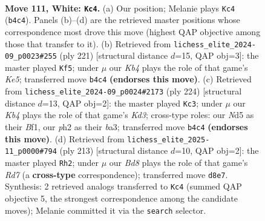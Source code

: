 \documentclass[11pt]{article}
\begin{document}
\clearpage

\begin{figure}[p]\centering
\begin{subfigure}{0.46\textwidth}\centering
\resizebox{\linewidth}{!}{%
\newchessgame
\chessboard[
  setfen={3B4/1k6/8/3N2R1/1K6/8/7p/8 w - - 0 111},
  showmover=false,
  pgfstyle=straightmove, color=movearrow, markmove={b4-c4}
]}
\caption{}
\end{subfigure}\hfill
\begin{subfigure}{0.46\textwidth}\centering
\resizebox{\linewidth}{!}{%
\newchessgame
\chessboard[
  setfen={8/8/2K2n2/8/3bk3/8/8/8 b - - 81 111},
  showmover=false,
  pgfstyle=straightmove, color=movearrow, markmove={e4-f5}
]}
\caption{}
\end{subfigure}
\\[4pt]
\begin{subfigure}{0.46\textwidth}\centering
\resizebox{\linewidth}{!}{%
\newchessgame
\chessboard[
  setfen={8/8/8/5p2/7k/b2K4/8/5B2 w - - 6 113},
  showmover=false,
  pgfstyle=straightmove, color=movearrow, markmove={d3-c3}
]}
\caption{}
\end{subfigure}\hfill
\begin{subfigure}{0.46\textwidth}\centering
\resizebox{\linewidth}{!}{%
\newchessgame
\chessboard[
  setfen={8/4R3/8/8/5k2/3n4/3r4/K7 b - - 45 107},
  showmover=false,
  pgfstyle=straightmove, color=movearrow, markmove={d2-h2}
]}
\caption{}
\end{subfigure}
\caption{\textbf{Move 111, White: \texttt{Kc4}.} (a) Our position; Melanie plays \texttt{Kc4} (\texttt{b4c4}). Panels (b)--(d) are the retrieved master positions whose correspondence most drove this move (highest QAP objective among those that transfer to it). (b) Retrieved from \texttt{lichess\_elite\_2024-09\_p0023\#255} (ply 221) [structural distance $d$=15, QAP obj=3]: the master played \texttt{Kf5}; under $\mu$ our \emph{Kb4} plays the role of that game's \emph{Ke5}; transferred move \texttt{b4c4} \textbf{(endorses this move)}. (c) Retrieved from \texttt{lichess\_elite\_2024-09\_p0024\#2173} (ply 224) [structural distance $d$=13, QAP obj=2]: the master played \texttt{Kc3}; under $\mu$ our \emph{Kb4} plays the role of that game's \emph{Kd3}; cross-type roles: our \emph{N}d5 as their \emph{B}f1, our \emph{p}h2 as their \emph{b}a3; transferred move \texttt{b4c4} \textbf{(endorses this move)}. (d) Retrieved from \texttt{lichess\_elite\_2025-11\_p0000\#794} (ply 213) [structural distance $d$=10, QAP obj=2]: the master played \texttt{Rh2}; under $\mu$ our \emph{Bd8} plays the role of that game's \emph{Rd7} (a \textbf{cross-type} correspondence); transferred move \texttt{d8e7}. Synthesis: 2 retrieved analogs transferred to \texttt{Kc4} (summed QAP objective 5, the strongest correspondence among the candidate moves); Melanie committed it via the \texttt{search} selector.}
\label{fig:thought-m220}
\end{figure}
\end{document}
